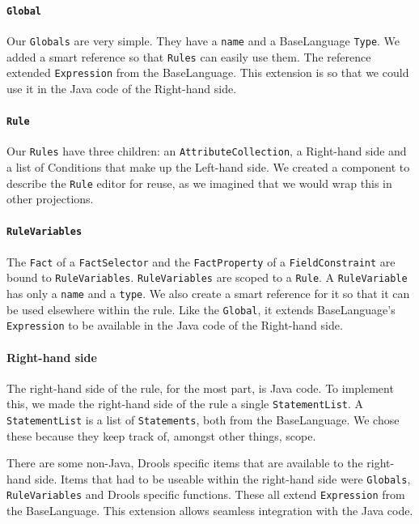 \paragraph{\texttt{Global}} Our \texttt{Globals} are very simple.
They have a \texttt{name} and a BaseLanguage \texttt{Type}.
We added a smart reference so that \texttt{Rules} can easily use them.
The reference extended \texttt{Expression} from the BaseLanguage.
This extension is so that we could use it in the Java code of the Right-hand side.

\paragraph{\texttt{Rule}} Our \texttt{Rules} have three children: an \texttt{AttributeCollection}, a Right-hand side and a list of Conditions that make up the Left-hand side.
We created a component to describe the \texttt{Rule} editor for reuse, as we imagined that we would wrap this in other projections.

\paragraph{\texttt{RuleVariables}} The \texttt{Fact} of a \texttt{FactSelector} and the \texttt{FactProperty} of a \texttt{FieldConstraint} are bound to \linebreak\texttt{RuleVariables}.
\texttt{RuleVariables} are scoped to a \texttt{Rule}.
A \texttt{RuleVariable} has only a \texttt{name} and a \texttt{type}.
We also create a smart reference for it so that it can be used elsewhere within the rule.
Like the \texttt{Global}, it extends BaseLanguage's \texttt{Expression} to be available in the Java code of the Right-hand side.

\paragraph{Right-hand side} The right-hand side of the rule, for the most part, is Java code.
To implement this, we made the right-hand side of the rule a single \texttt{StatementList}.
A \texttt{StatementList} is a list of \texttt{Statements}, both from the BaseLanguage.
We chose these because they keep track of, amongst other things, scope.

There are some non-Java, Drools specific items that are available to the right-hand side.
Items that had to be useable within the right-hand side were \texttt{Globals}, \texttt{RuleVariables} and Drools specific functions.
These all extend \texttt{Expression} from the BaseLanguage.
This extension allows seamless integration with the Java code.

